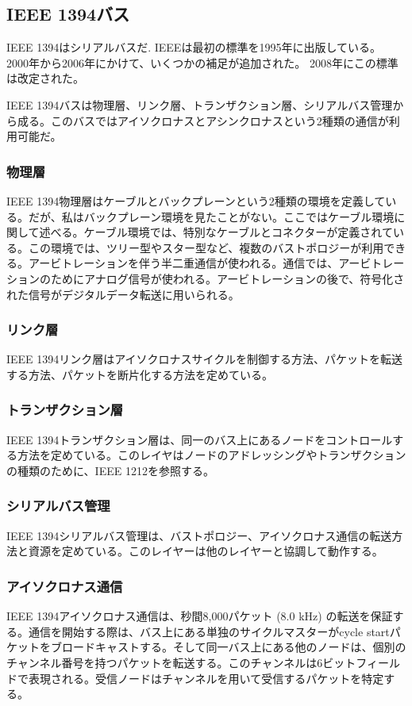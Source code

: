 \documentclass[onecolumn]{jarticle}
\begin{document}
\subsection{IEEE 1394バス}



IEEE 1394はシリアルバスだ. IEEEは最初の標準を1995年に出版している\cite{ieee1394-1}。 2000年から2006年にかけて、いくつかの補足が追加された\cite{ieee1394-1-a, ieee1394-1-b, ieee1394-1-c}。 2008年にこの標準は改定された\cite{ieee1394-2}。

IEEE 1394バスは物理層、リンク層、トランザクション層、シリアルバス管理から成る。このバスではアイソクロナスとアシンクロナスという2種類の通信が利用可能だ。

\subsubsection{物理層}
IEEE 1394物理層はケーブルとバックプレーンという2種類の環境を定義している。だが、私はバックプレーン環境を見たことがない。ここではケーブル環境に関して述べる。ケーブル環境では、特別なケーブルとコネクターが定義されている。この環境では、ツリー型やスター型など、複数のバストポロジーが利用できる。アービトレーションを伴う半二重通信が使われる。通信では、アービトレーションのためにアナログ信号が使われる。アービトレーションの後で、符号化された信号がデジタルデータ転送に用いられる。


\subsubsection{リンク層}
IEEE 1394リンク層はアイソクロナスサイクルを制御する方法、パケットを転送する方法、パケットを断片化する方法を定めている。


\subsubsection{トランザクション層}
IEEE 1394トランザクション層は、同一のバス上にあるノードをコントロールする方法を定めている。このレイヤはノードのアドレッシングやトランザクションの種類のために、IEEE 1212を参照する。

\subsubsection{シリアルバス管理}
IEEE 1394シリアルバス管理は、バストポロジー、アイソクロナス通信の転送方法と資源を定めている。このレイヤーは他のレイヤーと協調して動作する。

\subsubsection{アイソクロナス通信}
IEEE 1394アイソクロナス通信は、秒間8,000パケット (8.0 kHz) の転送を保証する。通信を開始する際は、バス上にある単独のサイクルマスターがcycle startパケットをブロードキャストする。そして同一バス上にある他のノードは、個別のチャンネル番号を持つパケットを転送する。このチャンネルは6ビットフィールドで表現される。受信ノードはチャンネルを用いて受信するパケットを特定する。
\end{document}
